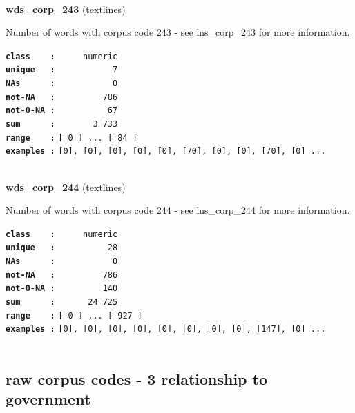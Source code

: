 \documentclass[]{article}
\begin{document}
~

\textbf{wds\_corp\_243} (textlines)

Number of words with corpus code 243 - see lns\_corp\_243 for more
information.

\textbf{\texttt{class\ \ \ \ :}} \texttt{~~~~~numeric}\\
\textbf{\texttt{unique\ \ \ :}} \texttt{~~~~~~~~~~~7}\\
\textbf{\texttt{NAs\ \ \ \ \ \ :}} \texttt{~~~~~~~~~~~0}\\
\textbf{\texttt{not-NA\ \ \ :}} \texttt{~~~~~~~~~786}\\
\textbf{\texttt{not-0-NA\ :}} \texttt{~~~~~~~~~~67}\\
\textbf{\texttt{sum\ \ \ \ \ \ :}} \texttt{~~~~~~~3~733}\\
\textbf{\texttt{range\ \ \ \ :}}
\texttt{{[}\ 0\ {]}\ ...\ {[}\ 84\ {]}}\\
\textbf{\texttt{examples\ :}}
\texttt{{[}0{]},\ {[}0{]},\ {[}0{]},\ {[}0{]},\ {[}0{]},\ {[}70{]},\ {[}0{]},\ {[}0{]},\ {[}70{]},\ {[}0{]}\ ...}\\

~

\textbf{wds\_corp\_244} (textlines)

Number of words with corpus code 244 - see lns\_corp\_244 for more
information.

\textbf{\texttt{class\ \ \ \ :}} \texttt{~~~~~numeric}\\
\textbf{\texttt{unique\ \ \ :}} \texttt{~~~~~~~~~~28}\\
\textbf{\texttt{NAs\ \ \ \ \ \ :}} \texttt{~~~~~~~~~~~0}\\
\textbf{\texttt{not-NA\ \ \ :}} \texttt{~~~~~~~~~786}\\
\textbf{\texttt{not-0-NA\ :}} \texttt{~~~~~~~~~140}\\
\textbf{\texttt{sum\ \ \ \ \ \ :}} \texttt{~~~~~~24~725}\\
\textbf{\texttt{range\ \ \ \ :}}
\texttt{{[}\ 0\ {]}\ ...\ {[}\ 927\ {]}}\\
\textbf{\texttt{examples\ :}}
\texttt{{[}0{]},\ {[}0{]},\ {[}0{]},\ {[}0{]},\ {[}0{]},\ {[}0{]},\ {[}0{]},\ {[}0{]},\ {[}147{]},\ {[}0{]}\ ...}\\

~

\subsection{raw corpus codes - 3 relationship to
government}\label{raw-corpus-codes---3-relationship-to-government}
\end{document}
